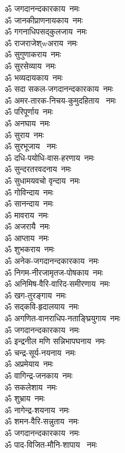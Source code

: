 \begin{flushleft}
\begin{multicols}{2}
ॐ जगदानन्दकारकाय~नमः\\
ॐ जानकीप्राणनायकाय~नमः\\
ॐ गगनाधिपसद्कुलजाय~नमः\\
ॐ राजराजेश्wअराय~नमः\\
ॐ सुगुणाकराय~नमः\\
ॐ सुरसेव्याय~नमः\\
ॐ भव्यदायकाय~नमः\\
ॐ सदा सकल-जगदानन्दकारकाय~नमः\\
ॐ अमर-तारक-निचय-कुमुदहिताय ~नमः\\
ॐ परिपूर्णाय~नमः\hfill{}\\
ॐ अनघाय~नमः\\
ॐ सुराय~नमः\\
ॐ सुरभूजाय ~नमः\\
ॐ दधि-पयोधि-वास-हरणाय~नमः\\
ॐ सुन्दरतरवदनाय~नमः\\
ॐ सुधामयवचो वृन्दाय~नमः\\
ॐ गोविन्दाय~नमः\\
ॐ सानन्दाय~नमः\\
ॐ मावराय~नमः\\
ॐ अजरायै~नमः\hfill{}\\
ॐ आप्ताय~नमः\\
ॐ शुभकराय~नमः\\
ॐ अनेक-जगदानन्दकारकाय~नमः\\
ॐ निगम-नीरजामृतज-पोषकाय~नमः\\
ॐ अनिमिष-वैरि-वारिद-समीरणाय~नमः\\
ॐ खग-तुरङ्गाय~नमः\\
ॐ सद्कवि-हृदालयाय~नमः\\
ॐ अगणित-वानराधिप-नताङ्घ्रियुगाय~नमः\\
ॐ जगदानन्दकारकाय~नमः\\
ॐ इन्द्रनील मणि सन्निभापघनाय~नमः\hfill{}\\
ॐ चन्द्र-सूर्य-नयनाय~नमः\\
ॐ अप्रमेयाय~नमः\\
ॐ वागिन्द्र-जनकाय~नमः\\
ॐ सकलेशाय~नमः\\
ॐ शुभ्राय~नमः\\
ॐ नागेन्द्र-शयनाय~नमः\\
ॐ शमन-वैरि-सन्नुताय~नमः\\
ॐ जगदानन्दकारकाय~नमः\\
ॐ पाद-विजित-मौनि-शापाय ~नमः\\

\end{multicols}
\end{flushleft}
